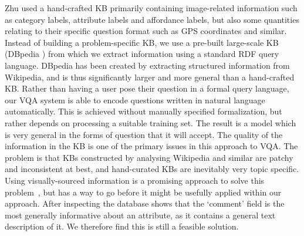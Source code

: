 %
Zhu \etal \cite{zhu2015building} used a hand-crafted KB primarily containing image-related information such as category labels, attribute labels and affordance labels, but also some quantities relating to their specific question format such as GPS coordinates and similar. %
Instead of building a problem-specific KB, we use a pre-built large-scale KB (DBpedia \cite{auer2007dbpedia}) from which we extract information using a standard RDF query language. DBpedia has been created by extracting structured information from Wikipedia, and is thus significantly larger and more general than a hand-crafted KB. Rather than having a user pose their question in a formal query language, our VQA system is able to encode questions written in natural language automatically.  This is achieved without manually specified formalization, but rather depends on processing a suitable training set. The result is a model which is very general in the forms of question that it will accept.
The quality of the information in the KB is one of the primary issues in this approach to VQA. The problem is that KBs constructed by analysing Wikipedia and similar are patchy and inconsistent at best, and hand-curated KBs are inevitably very topic specific. Using visually-sourced information is a promising approach to solve this problem~\cite{Lin_2015_CVPR, Sadeghi_2015_CVPR}, but has a way to go before it might be usefully applied within our approach. After inspecting the database shows that the ‘comment’ field is the most generally informative about an attribute, as it contains a general text description of it. We therefore find this is still a feasible solution. 
